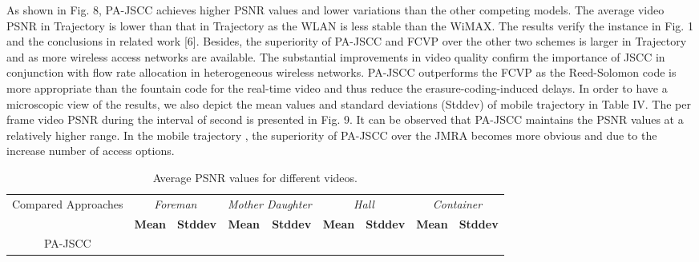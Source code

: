 \documentclass[journal]{IEEEtran}
\begin{document}
As shown in Fig. 8, PA-JSCC achieves higher PSNR values and lower variations than the other competing models. The average video PSNR in Trajectory  is lower than that in Trajectory  as the WLAN is less stable than the WiMAX. The results verify the instance in Fig. 1 and the conclusions in related work [6]. Besides, the superiority of PA-JSCC and FCVP over the other two schemes is larger in Trajectory  and  as more wireless access networks are available. The substantial improvements in video quality confirm the importance of JSCC in conjunction with flow rate allocation in heterogeneous wireless networks. PA-JSCC outperforms the FCVP as the Reed-Solomon code is more appropriate than the fountain code for the real-time video and thus reduce the erasure-coding-induced delays. In order to have a microscopic view of the results, we also depict the mean values and standard deviations (Stddev) of mobile trajectory  in Table IV. The per frame video PSNR during the interval of  second is presented in Fig. 9. It can be observed that PA-JSCC maintains the PSNR values at a relatively higher range. In the mobile trajectory , the superiority of PA-JSCC over the JMRA becomes more obvious and due to the increase number of access options.
\begin{table*}[htbp]
\footnotesize
     \centering
         \renewcommand{\arraystretch}{1}
        \centering
      \caption{Average PSNR values for different videos.}
        \centering
        \begin{tabular}{|c||c||c||c||c||c||c||c||c|}
      \hline
        \multirow{2}{*}{Compared Approaches} & \multicolumn{2}{c||}{\emph{Foreman}} & \multicolumn{2}{c||}{\emph{Mother  Daughter}} & \multicolumn{2}{c||}{\emph{Hall}} & \multicolumn{2}{c|}{\emph{Container}}\\
       \cline{2-9}
        &\bfseries Mean & \bfseries Stddev  &\bfseries Mean & \bfseries Stddev  &\bfseries Mean & \bfseries Stddev&\bfseries Mean & \bfseries Stddev  \\
        \hline
        \hline
        PA-JSCC &  &  &  & &  & &  & \\
\hline
      \end{tabular}
\end{table*}
\end{document}

